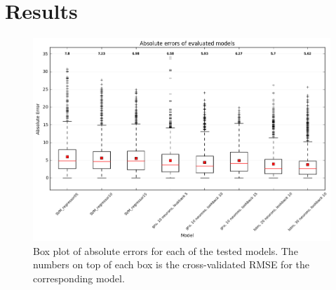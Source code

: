     \section{Results}

    \begin{figure}[H]
        \centering
        \includegraphics[width=\linewidth]{../images/plot_box_error_models.png}
        \caption{Box plot of absolute errors for each of the tested models. The numbers on top of each box is the cross-validated RMSE for the corresponding model.} \label{fig:box_error}
    \end{figure}

